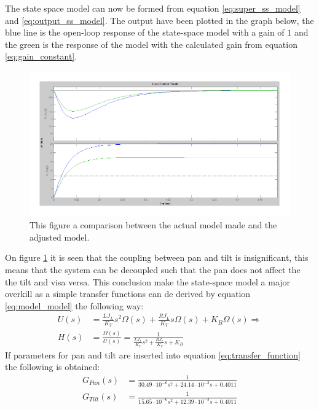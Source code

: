 The state space model can now be formed from equation \ref{eq:super_ss_model} and \ref{eq:output_ss_model}. The output have been plotted in the graph below, the blue line is the open-loop response of the state-space model with a gain of $1$ and the green is the response of the model with the calculated gain from equation \ref{eq:gain_constant}.
\begin{figure}[htb]
	\begin{center}
	\includegraphics[scale=1,trim=0 0 0 0]{graphics/ZoomOpenLoop.pdf} %
	\caption{This figure a comparison between the actual model made and the adjusted model.}
	\label{fig:zoom_step}			%
	\end{center}
\end{figure}
On figure \ref{fig:zoom_step} it is seen that the coupling between pan and tilt is insignificant, this means that the system can be decoupled such that the pan does not affect the the tilt and visa versa. This conclusion make the state-space model a major overkill as a simple transfer functions can de derived by equation \ref{eq:model_model} the following way:
\begin{align}
	U(s) &= \frac{L J_L}{K_T} s^2 \Omega(s) + \frac{R J_L}{K_T} s \Omega(s) + K_B \Omega(s) \Rightarrow\\
	H(s) &= \frac{\Omega(s)}{U(s)} = \frac{1}{\frac{L J_L}{K_T} s^2 + \frac{R J_L}{K_T} s + K_B}\label{eq:transfer_function}
\end{align}
If parameters for pan and tilt are inserted into equation \ref{eq:transfer_function} the following is obtained:
\begin{align}
	G_{Pan}(s) &= \frac{1}{30.49 \cdot 10^{-6} s^2 + 24.14 \cdot 10^{-3} s + 0.4011}\label{eq:transfer_function_pan}\\
	G_{Tilt}(s) &= \frac{1}{15.65 \cdot 10^{-6} s^2 + 12.39 \cdot 10^{-3} s + 0.4011}\label{eq:transfer_function_tilt}
\end{align}

